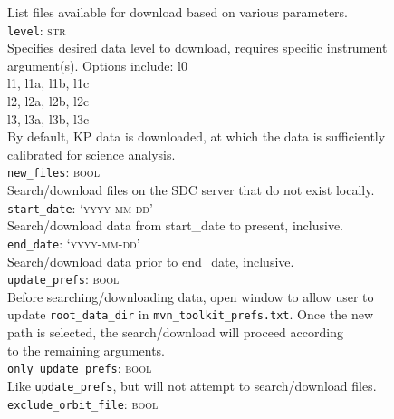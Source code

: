 \documentclass{article}
\begin{document}
\indent \indent List files available for download based on various parameters.\\
\indent \texttt{level}: \textsc{str}\\
\indent \indent Specifies desired data level to download, requires specific instrument\\
\indent \indent argument(s). Options include: l0\\
\indent \indent \indent \indent \indent \indent \indent \indent \indent \indent \indent \thinspace l1, l1a, l1b, l1c\\
\indent \indent \indent \indent \indent \indent \indent \indent \indent \indent \indent \thinspace l2, l2a, l2b, l2c\\
\indent \indent \indent \indent \indent \indent \indent \indent \indent \indent \indent \thinspace l3, l3a, l3b, l3c\\
\indent \indent By default, KP data is downloaded, at which the data is sufficiently\\
\indent \indent calibrated for science analysis.\\
\indent \texttt{new\_files}: \textsc{bool}\\
\indent \indent Search/download files on the SDC server that do not exist locally.\\
\indent \texttt{start\_date}: \textsc{`yyyy-mm-dd'}\\
\indent \indent Search/download data from start\_date to present, inclusive.\\
\indent \texttt{end\_date}: \textsc{`yyyy-mm-dd'}\\
\indent \indent Search/download data prior to end\_date, inclusive.\\
\indent \texttt{update\_prefs}: \textsc{bool}\\
\indent \indent Before searching/downloading data, open window to allow user to\\
\indent \indent update \texttt{root\_data\_dir} in \texttt{mvn\_toolkit\_prefs.txt}. Once the new\\
\indent \indent path is selected, the search/download will proceed according\\
\indent \indent to the remaining arguments.\\
\indent \texttt{only\_update\_prefs}: \textsc{bool}\\
\indent \indent Like \texttt{update\_prefs}, but will not attempt to search/download files.\\
\indent \texttt{exclude\_orbit\_file}: \textsc{bool}\\
\end{document}
